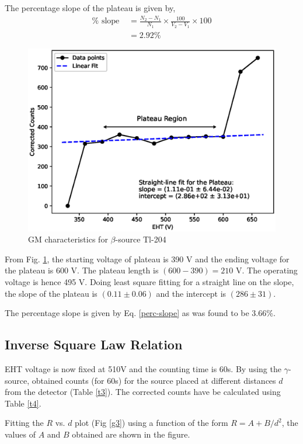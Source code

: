 The percentage slope of the plateau is given by,
\begin{align} \label{perc-slope}
    \% \text{ slope } &= \frac{N_2-N_1}{N_1}\times \frac{100}{V_2-V_1}\times 100\\
    &= 2.92 \% \nonumber
\end{align}

\begin{figure}[H]
    \centering
    \includegraphics[width=1\columnwidth]{images/calib-beta.eps}
    \caption{GM characteristics for $\beta$-source Tl-204}
    \label{g2}
\end{figure}

From Fig. \ref{g2}, the starting voltage of plateau is 390 V and the ending voltage for the plateau is 600 V.
The plateau length is $(600-390)=210$ V. The operating voltage is hence 495 V. Doing least square fitting for a straight line on the slope, the slope of the plateau is $(0.11 \pm 0.06)$ and the intercept is $(286 \pm 31)$.

The percentage slope is given by Eq. \ref{perc-slope} as was found to be $3.66$\%.

\subsection{Inverse Square Law Relation}
EHT voltage is now fixed at 510V and the counting time is 60s.
By using the $\gamma$-source, obtained counts (for 60s) for the source placed at different distances $d$ from the detector (Table \ref{t3}). The corrected counts have be calculated using Table \ref{t4}.

Fitting the $R$ vs. $d$ plot (Fig \ref{g3}) using a function of the form $R=A+B/d^2$, the values of $A$ and $B$ obtained are shown in the figure.


